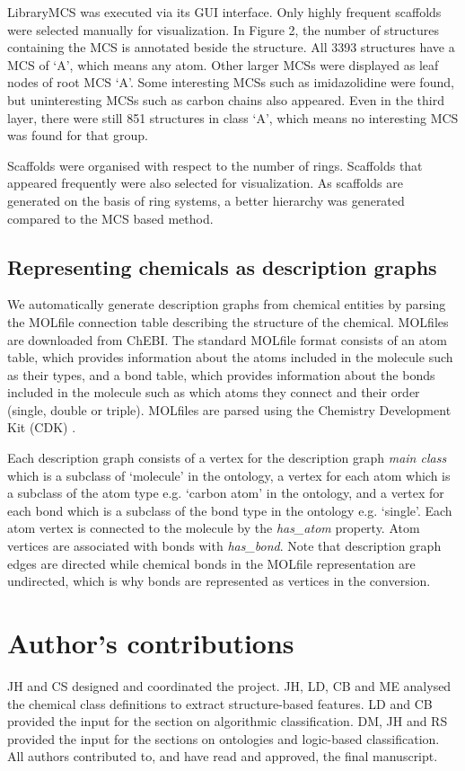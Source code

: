 \documentclass[10pt]{bmc_article}
\newenvironment{bmcformat}{\baselineskip20pt\sloppy\setboolean{publ}{false}}{\baselineskip20pt\sloppy}
\begin{document}
\begin{bmcformat}
LibraryMCS was executed via its GUI interface. Only highly frequent scaffolds were selected manually for visualization. In Figure 2, the number of structures containing the MCS is annotated beside the structure. All 3393 structures have a MCS of `A', which means any atom. Other larger MCSs were displayed as leaf nodes of root MCS `A'. Some interesting MCSs such as imidazolidine were found, but uninteresting MCSs such as carbon chains also appeared. Even in the third layer, there were still 851 structures in class `A', which means no interesting MCS was found for that group.

Scaffolds were organised with respect to the number of rings. Scaffolds that appeared frequently were also selected for visualization. As scaffolds are generated on the basis of ring systems, a better hierarchy was generated compared to the MCS based method.


\subsection*{Representing chemicals as description graphs}

We automatically generate description graphs from chemical entities by parsing the MOLfile connection table describing the structure of the chemical. MOLfiles are downloaded from ChEBI. The standard MOLfile format consists of an atom table, which provides information about the atoms included in the molecule such as their types, and a bond table, which provides information about the bonds included in the molecule such as which atoms they connect and their order (single, double or triple). MOLfiles are parsed using the Chemistry Development Kit (CDK) \cite{cdk2006}.

Each description graph consists of a vertex for the description graph \textit{main class} which is a subclass of `molecule' in the ontology, a vertex for each atom which is a subclass of the atom type e.g. `carbon atom' in the ontology, and a vertex for each bond which is a subclass of the bond type in the ontology e.g. `single'. Each atom vertex is connected to the molecule by the \textit{has\_atom} property. Atom vertices are associated with bonds with \textit{has\_bond}. Note that description graph edges are directed while chemical bonds in the MOLfile representation are undirected, which is why bonds are represented as vertices in the conversion. 

\bigskip


\section*{Author's contributions}
    JH and CS designed and coordinated the project. JH, LD, CB and ME analysed the chemical class definitions to extract structure-based features. LD and CB provided the input for the section on algorithmic classification. DM, JH and RS provided the input for the sections on ontologies and logic-based classification. All authors contributed to, and have read and approved, the final manuscript. 


\end{bmcformat}
\end{document}
